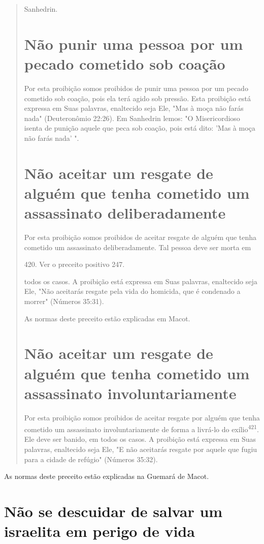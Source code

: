 \begin{quote}
Sanhedrin.

\section{Não punir uma pessoa por um pecado cometido sob coação}

Por esta proibição somos proibidos de punir uma pessoa por um pe­cado
cometido sob coação, pois ela terá agido sob pressão. Esta proibição
está expressa em Suas palavras, enaltecido seja Ele, "Mas à moça não
farás nada" (Deuteronômio 22:26). Em Sanhedrin lemos: "O Misericordioso
isenta de pu­nição aquele que peca sob coação, pois está dito: 'Mas à
moça não farás nada' ".

\section{Não aceitar um resgate de alguém que tenha 
cometido um assassinato deliberadamente}

Por esta proibição somos proibidos de aceitar resgate de alguém que
tenha cometido um assassinato deliberadamente. Tal pessoa deve ser morta
em

420. Ver o preceito positivo 247.

todos os casos. A proibição está expressa em Suas palavras, enaltecido
seja Ele, "Não aceitarás resgate pela vida do homicida, que é condenado
a morrer" (Nú­meros 35:31).

As normas deste preceito estão explicadas em Macot.

\section{Não aceitar um resgate de alguém que tenha cometido 
um assassinato involuntariamente}

Por esta proibição somos proibidos de aceitar resgate por alguém que
tenha cometido um assassinato involuntariamente de forma a livrá-lo do
exílio\textsuperscript{421}. Ele deve ser banido, em todos os casos. A
proibição está expressa em Suas palavras, enaltecido seja Ele, "E não
aceitarás resgate por aquele que fugiu para a cidade de refúgio"
(Números 35:32).
\end{quote}

As normas deste preceito estão explicadas na Guemará de Macot.

\section{Não se descuidar de salvar um israelita em perigo de vida}


